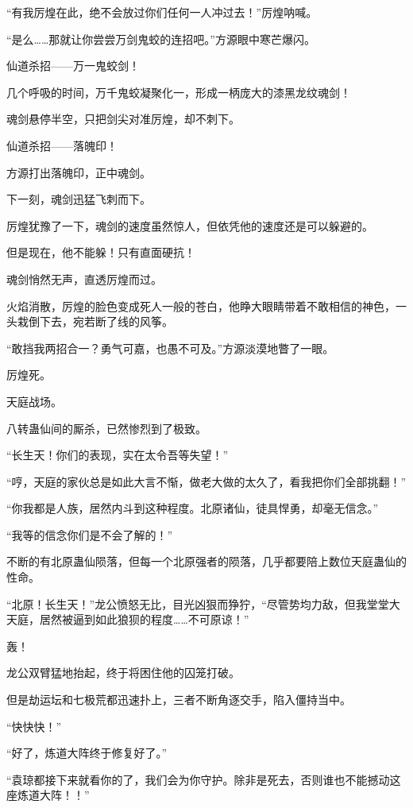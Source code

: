 \begin{this_body}
“有我厉煌在此，绝不会放过你们任何一人冲过去！”厉煌呐喊。

“是么……那就让你尝尝万剑鬼蛟的连招吧。”方源眼中寒芒爆闪。

仙道杀招——万一鬼蛟剑！

几个呼吸的时间，万千鬼蛟凝聚化一，形成一柄庞大的漆黑龙纹魂剑！

魂剑悬停半空，只把剑尖对准厉煌，却不刺下。

仙道杀招——落魄印！

方源打出落魄印，正中魂剑。

下一刻，魂剑迅猛飞刺而下。

厉煌犹豫了一下，魂剑的速度虽然惊人，但依凭他的速度还是可以躲避的。

但是现在，他不能躲！只有直面硬抗！

魂剑悄然无声，直透厉煌而过。

火焰消散，厉煌的脸色变成死人一般的苍白，他睁大眼睛带着不敢相信的神色，一头栽倒下去，宛若断了线的风筝。

“敢挡我两招合一？勇气可嘉，也愚不可及。”方源淡漠地瞥了一眼。

厉煌死。

天庭战场。

八转蛊仙间的厮杀，已然惨烈到了极致。

“长生天！你们的表现，实在太令吾等失望！”

“哼，天庭的家伙总是如此大言不惭，做老大做的太久了，看我把你们全部挑翻！”

“你我都是人族，居然内斗到这种程度。北原诸仙，徒具悍勇，却毫无信念。”

“我等的信念你们是不会了解的！”

不断的有北原蛊仙陨落，但每一个北原强者的陨落，几乎都要陪上数位天庭蛊仙的性命。

“北原！长生天！”龙公愤怒无比，目光凶狠而狰狞，“尽管势均力敌，但我堂堂大天庭，居然被逼到如此狼狈的程度……不可原谅！”

轰！

龙公双臂猛地抬起，终于将困住他的囚笼打破。

但是劫运坛和七极荒都迅速扑上，三者不断角逐交手，陷入僵持当中。

“快快快！”

“好了，炼道大阵终于修复好了。”

“袁琼都接下来就看你的了，我们会为你守护。除非是死去，否则谁也不能撼动这座炼道大阵！！”


\end{this_body}
